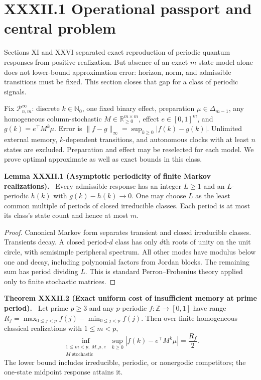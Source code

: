 \documentclass[11pt,a4paper,oneside]{book}
\newcommand{\R}{\mathbb R}\newcommand{\C}{\mathbb C}\newcommand{\Z}{\mathbb Z}\newcommand{\N}{\mathbb N}\newcommand{\Q}{\mathbb Q}
\newcommand{\statement}[3]{\par\medskip\noindent\textbf{#1 #2 (#3).}\ }
\begin{document}
\section*{XXXII.1 Operational passport and central problem}
Sections XI and XXVI separated exact reproduction of periodic quantum responses from positive realization. But absence of an exact $m$-state model alone does not lower-bound approximation error: horizon, norm, and admissible transitions must be fixed. This section closes that gap for a class of periodic signals.

Fix $\mathcal P_{n,m}^{\infty}$: discrete $k\in\N_0$, one fixed binary effect, preparation $\mu\in\Delta_{m-1}$, any homogeneous column-stochastic $M\in\R_{\ge0}^{m\times m}$, effect $e\in[0,1]^m$, and $g(k)=e^\top M^k\mu$. Error is $\|f-g\|_\infty=\sup_{k\ge0}|f(k)-g(k)|$. Unlimited external memory, $k$-dependent transitions, and autonomous clocks with at least $n$ states are excluded. Preparation and effect may be reselected for each model. We prove optimal approximate as well as exact bounds in this class.
\statement{Lemma}{XXXII.1}{Asymptotic periodicity of finite Markov realizations} Every admissible response has an integer $L\ge1$ and an $L$-periodic $h(k)$ with $g(k)-h(k)\to0$. One may choose $L$ as the least common multiple of periods of closed irreducible classes. Each period is at most its class's state count and hence at most $m$.
\begin{proof}Canonical Markov form separates transient and closed irreducible classes. Transients decay. A closed period-$d$ class has only $d$th roots of unity on the unit circle, with semisimple peripheral spectrum. All other modes have modulus below one and decay, including polynomial factors from Jordan blocks. The remaining sum has period dividing $L$. This is standard Perron--Frobenius theory applied only to finite stochastic matrices.\end{proof}
\statement{Theorem}{XXXII.2}{Exact uniform cost of insufficient memory at prime period} Let prime $p\ge3$ and any $p$-periodic $f:\Z\to[0,1]$ have range $R_f=\max_{0\le j<p}f(j)-\min_{0\le j<p}f(j)$. Then over finite homogeneous classical realizations with $1\le m<p$,
\begin{equation}\inf_{\substack{1\le m<p,\ M,\mu,e\\M\text{ stochastic}}}\sup_{k\ge0}|f(k)-e^\top M^k\mu|=\frac{R_f}2.\tag{113}\end{equation}
The lower bound includes irreducible, periodic, or nonergodic competitors; the one-state midpoint response attains it.
\end{document}
